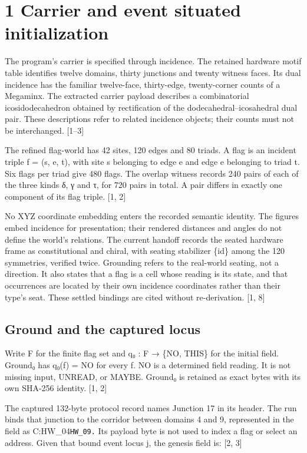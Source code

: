 \documentclass[
]{article}
\begin{document}
\section{1 Carrier and event situated
initialization}\label{carrier-and-event-situated-initialization}

The program's carrier is specified through incidence. The retained
hardware motif table identifies twelve domains, thirty junctions and
twenty witness faces. Its dual incidence has the familiar twelve-face,
thirty-edge, twenty-corner counts of a Megaminx. The extracted carrier
payload describes a combinatorial icosidodecahedron obtained by
rectification of the dodecahedral--icosahedral dual pair. These
descriptions refer to related incidence objects; their counts must not
be interchanged. {[}1--3{]}

The refined flag-world has 42 sites, 120 edges and 80 triads. A flag is
an incident triple f = (s, e, t), with site s belonging to edge e and
edge e belonging to triad t. Six flags per triad give 480 flags. The
overlap witness records 240 pairs of each of the three kinds δ, γ and τ,
for 720 pairs in total. A pair differs in exactly one component of its
flag triple. {[}1, 2{]}

No XYZ coordinate embedding enters the recorded semantic identity. The
figures embed incidence for presentation; their rendered distances and
angles do not define the world's relations. The current handoff records
the seated hardware frame as constitutional and chiral, with seating
stabilizer \{id\} among the 120 symmetries, verified twice. Grounding
refers to the real-world seating, not a direction. It also states that a
flag is a cell whose reading is its state, and that occurrences are
located by their own incidence coordinates rather than their type's
seat. These settled bindings are cited without re-derivation. {[}1, 8{]}

\subsection{Ground and the captured
locus}\label{ground-and-the-captured-locus}

Write F for the finite flag set and q₀ : F → \{NO, THIS\} for the
initial field. Ground₀ has q₀(f) = NO for every f. NO is a determined
field reading. It is not missing input, UNREAD, or MAYBE. Ground₀ is
retained as exact bytes with its own SHA-256 identity. {[}1, 2{]}

The captured 132-byte protocol record names Junction 17 in its header.
The run binds that junction to the corridor between domains 4 and 9,
represented in the field as C:HW\_04\textbar{}\nolinkurl{HW_09.} Its
payload byte is not used to index a flag or select an address. Given
that bound event locus j, the genesis field is: {[}2, 3{]}
\end{document}
